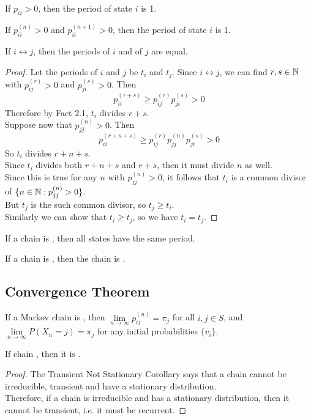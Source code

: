 \documentclass[11pt]{article}
\newcommand{\dur}[3]{{#1}_{#2}^{({#3})}}
\renewcommand{\limit}[1]{\underset{{#1} \rightarrow \infty}{\lim}}
\begin{document}
    \fact
    If $p_{ii} >0$, then the period of state $i$ is 1.
    
    \fact
    If $\dur{p}{ii}{n} > 0$ and $\dur{p}{ii}{n+1} > 0$, then the period of state $i$ is 1.
    
     If $i \leftrightarrow j$, then the periods of $i$ and of $j$ are equal.
    \begin{proof}
    	Let the periods of $i$ and $j$ be $t_i$ and $t_j$. Since $i \leftrightarrow j$, we can find $r, s\in \mathbb{N}$ with $\dur{p}{ij}{r} > 0$ and $\dur{p}{ji}{s} > 0$. Then
    	$$\dur{p}{ii}{r+s} \geq \dur{p}{ij}{r}\dur{p}{ji}{s} > 0$$
    	Therefore by Fact 2.1, $t_i$ divides $r + s$.\\
    	Suppose now that $\dur{p}{jj}{n} > 0$. Then
    	$$\dur{p}{ii}{r + n +s} \geq \dur{p}{ij}{r}\dur{p}{jj}{n} \dur{p}{ji}{s} > 0$$
    	So $t_i$ divides $r + n +s$. \\
    	Since $t_i$ divides both $r + n +s$ and $r + s$, then it must divide $n$ as well. \\
    	Since this is true for any $n$ with $\dur{p}{jj}{n} > 0$, it follows that $t_i$ is a common divisor of $\{n \in \mb{N}: \dur{p}{jj}{n} > 0\}$.\\
    	But $t_j$ is the  such common divisor, so $t_j \geq t_i$.\\
    	Similarly we can show that $t_i \geq t_j$, so we have $t_i = t_j$.
  
    	
    \end{proof} 
    
    If a chain is , then all states have the same period.
    
    \corollary If a chain is , then the chain is .
    
    \subsection{Convergence Theorem}
     If a Markov chain is , then $\limit{n} p_{ij}^{(n)} = \pi_j$ for all $i, j \in S$, and $\limit{n} P(X_n = j) = \pi_j$ for any initial probabilities $\{v_i\}$.
    
     If chain , then it is .
    \begin{proof}
    	The Transient Not Stationary Corollary says that a chain cannot be irreducible, transient and have a stationary distribution. \\
    	Therefore, if a chain is irreducible and has a stationary distribution, then it cannot be transient, i.e. it must be recurrent.
    \end{proof}
    
\end{document}
